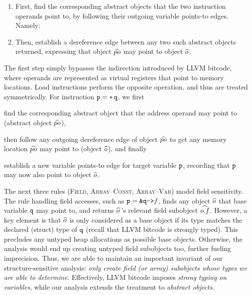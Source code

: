 \begin{enumerate}
\item First, find the corresponding abstract objects that the two
  instruction operands point to, by following their outgoing variable
  points-to edges. Namely:
\item Then, establish a dereference edge between any two such abstract
  objects returned, expressing that object $\widehat{po}$ may point to
  object $\widehat{o}$.
\end{enumerate}
The first step simply bypasses the indirection introduced by LLVM
bitcode, where operands are represented as virtual registers that
point to memory locations.
Load instructions perform the opposite operation, and thus are treated
symmetrically. For instruction $\loadinstr{p}{q}$, we first
\begin{inparaenum}[(i)]
\item find the corresponding abstract object that the address operand
  may point to (abstract object $\widehat{po}$),
\item then follow any outgoing dereference edge of object $\widehat{po}$
  to get any memory location $\widehat{po}$ may point to (object
  $\widehat{o}$), and finally
\item establish a new variable points-to edge for target variable
  $\texttt{p}$, recording that $\texttt{p}$ may now also point to object
  $\widehat{o}$.
\end{inparaenum}

The next three rules (\textsc{Field, Array--Const, Array--Var}) model field sensitivity. The rule
handling field accesses, such as $\fieldaccess{p}{q}{f}$, finds any
object $\widehat{o}$ that base variable $\texttt{q}$ may point to, and
returns $\widehat{o}\,$'s relevant field subobject
$\widehat{o.f}$. However, a key element is that $\widehat{o}$
is only considered as a base object if its type matches the declared
(struct) type of $\texttt{q}$ (recall that LLVM bitcode is strongly
typed). This precludes any untyped heap allocations as possible base
objects. Otherwise, the analysis would end up creating untyped field
subobjects too, further fueling imprecision. Thus, we are able to
maintain an important invariant of our structure-sensitive analysis:
\emph{only create field (or array) subobjects whose types we are able
  to determine}. Effectively, LLVM bitcode  imposes
\emph{strong typing on variables}, while our analysis extends the treatment
to \emph{abstract objects}.

